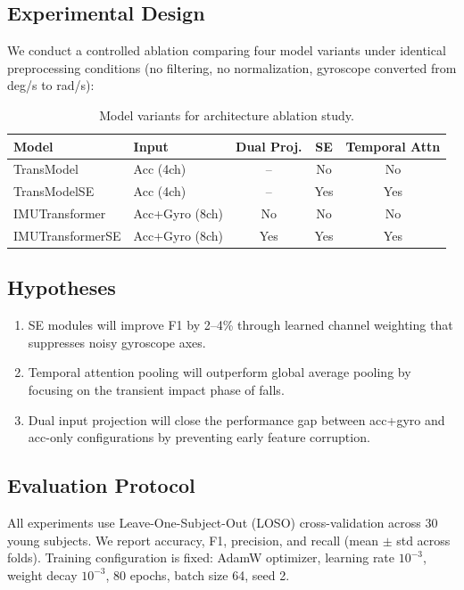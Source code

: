 \subsection{Experimental Design}

We conduct a controlled ablation comparing four model variants under identical preprocessing conditions (no filtering, no normalization, gyroscope converted from deg/s to rad/s):

\begin{table}[h]
    \centering
    \caption{Model variants for architecture ablation study.}
    \label{tab:ablation_models}
    \begin{tabular}{llccc}
        \toprule
        Model & Input & Dual Proj. & SE & Temporal Attn \\
        \midrule
        TransModel & Acc (4ch) & -- & No & No \\
        TransModelSE & Acc (4ch) & -- & Yes & Yes \\
        IMUTransformer & Acc+Gyro (8ch) & No & No & No \\
        IMUTransformerSE & Acc+Gyro (8ch) & Yes & Yes & Yes \\
        \bottomrule
    \end{tabular}
\end{table}

\subsection{Hypotheses}

\begin{enumerate}[label=\textbf{H\arabic*}:]
    \item SE modules will improve F1 by 2--4\% through learned channel weighting that suppresses noisy gyroscope axes.
    \item Temporal attention pooling will outperform global average pooling by focusing on the transient impact phase of falls.
    \item Dual input projection will close the performance gap between acc+gyro and acc-only configurations by preventing early feature corruption.
\end{enumerate}

\subsection{Evaluation Protocol}

All experiments use Leave-One-Subject-Out (LOSO) cross-validation across 30 young subjects. We report accuracy, F1, precision, and recall (mean $\pm$ std across folds). Training configuration is fixed: AdamW optimizer, learning rate $10^{-3}$, weight decay $10^{-3}$, 80 epochs, batch size 64, seed 2.

